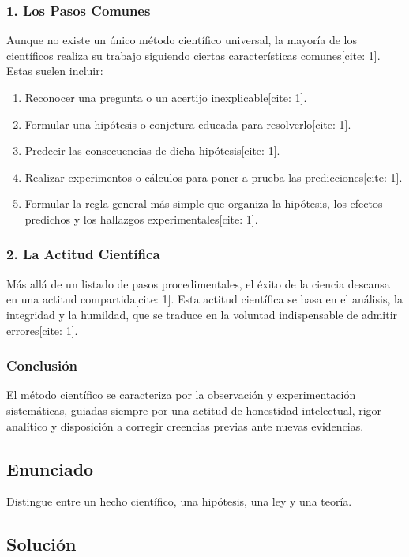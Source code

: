 \documentclass[12pt, a4paper]{article}
\begin{document}
\subsubsection*{1. Los Pasos Comunes}
Aunque no existe un único método científico universal, la mayoría de los científicos realiza su trabajo siguiendo ciertas características comunes[cite: 1]. Estas suelen incluir:
\begin{enumerate}
    \item Reconocer una pregunta o un acertijo inexplicable[cite: 1].
    \item Formular una hipótesis o conjetura educada para resolverlo[cite: 1].
    \item Predecir las consecuencias de dicha hipótesis[cite: 1].
    \item Realizar experimentos o cálculos para poner a prueba las predicciones[cite: 1].
    \item Formular la regla general más simple que organiza la hipótesis, los efectos predichos y los hallazgos experimentales[cite: 1].
\end{enumerate}

\subsubsection*{2. La Actitud Científica}
Más allá de un listado de pasos procedimentales, el éxito de la ciencia descansa en una actitud compartida[cite: 1]. Esta actitud científica se basa en el análisis, la integridad y la humildad, que se traduce en la voluntad indispensable de admitir errores[cite: 1].

\subsubsection*{Conclusión}
El método científico se caracteriza por la observación y experimentación sistemáticas, guiadas siempre por una actitud de honestidad intelectual, rigor analítico y disposición a corregir creencias previas ante nuevas evidencias.

\newpage

\subsection*{Enunciado}
Distingue entre un hecho científico, una hipótesis, una ley y una teoría.

\subsection*{Solución}
\end{document}
